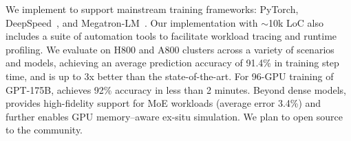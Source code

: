 We implement \sys to support mainstream training frameworks: PyTorch,  DeepSpeed~\cite{rasley2020deepspeed}, and Megatron-LM~\cite{shoeybi2019megatron}.
Our implementation with $\sim$10k LoC also includes a suite of automation tools to facilitate workload tracing and runtime profiling.
We evaluate \sys on H800 and A800 clusters across a variety of scenarios and models, achieving an average prediction accuracy of 91.4\% in training step time, and is up to 3x better than the state-of-the-art. 
For 96-GPU training of GPT-175B, \sys achieves 92\% accuracy in less than 2 minutes. 
Beyond dense models, \sys provides high-fidelity support for MoE workloads (average error 3.4\%) and further enables GPU memory–aware ex-situ simulation. 
We plan to open source \sys to the community.







